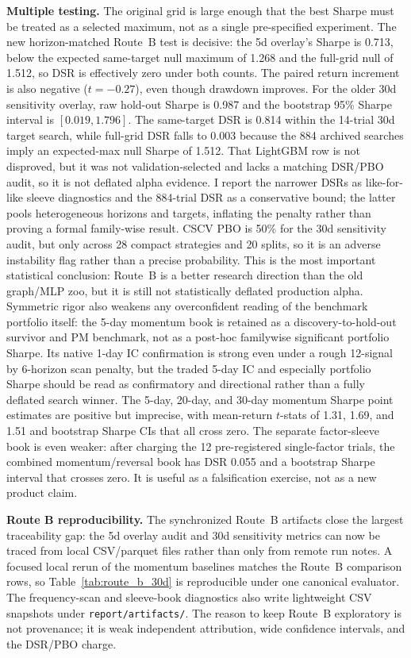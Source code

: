 \documentclass[9pt]{extarticle}
\begin{document}
\textbf{Multiple testing.} The original grid is large enough that the best
Sharpe must be treated as a selected maximum, not as a single pre-specified
experiment. The new horizon-matched Route~B test is decisive: the 5d overlay's
Sharpe is 0.713, below the expected same-target null maximum of 1.268 and the
full-grid null of 1.512, so DSR is effectively zero under both counts. The paired
return increment is also negative ($t=-0.27$), even though drawdown improves. For
the older 30d sensitivity overlay, raw hold-out Sharpe is 0.987 and the bootstrap
95\% Sharpe interval is $[0.019,1.796]$. The same-target DSR is 0.814 within the
14-trial 30d target search, while full-grid DSR falls to 0.003 because the 884
archived searches imply an expected-max null Sharpe of 1.512. That LightGBM row
is not disproved, but it was not validation-selected and lacks a matching
DSR/PBO audit, so it is not deflated alpha evidence. I report the narrower DSRs
as like-for-like sleeve diagnostics and the 884-trial DSR as a conservative
bound; the latter pools heterogeneous horizons and targets, inflating the penalty
rather than proving a formal family-wise result. CSCV PBO is 50\% for the 30d
sensitivity audit, but only across 28 compact strategies and 20 splits, so it is
an adverse instability flag rather than a precise probability. This is the most
important statistical conclusion: Route~B is a better research direction than
the old graph/MLP zoo, but it is still not statistically deflated production
alpha. Symmetric rigor
also weakens any overconfident reading of the benchmark portfolio itself: the
5-day momentum book is retained as a discovery-to-hold-out survivor and PM
benchmark, not as a post-hoc familywise significant portfolio Sharpe. Its
native 1-day IC confirmation is strong even under a rough 12-signal by 6-horizon
scan penalty, but the traded 5-day IC and especially portfolio Sharpe should be
read as confirmatory and directional rather than a fully deflated search
winner. The 5-day, 20-day, and 30-day momentum Sharpe point estimates are
positive but imprecise, with mean-return $t$-stats of 1.31, 1.69, and 1.51 and
bootstrap Sharpe CIs that all cross zero. The separate factor-sleeve book is even weaker:
after charging
the 12 pre-registered single-factor trials, the combined momentum/reversal book
has DSR 0.055 and a bootstrap Sharpe interval that crosses zero. It is useful as
a falsification exercise, not as a new product claim.

\textbf{Route B reproducibility.} The synchronized Route~B artifacts close the
largest traceability gap: the 5d overlay audit and 30d sensitivity metrics can
now be traced from local CSV/parquet files rather than only from remote run
notes. A focused local rerun of the momentum baselines matches the Route~B
comparison rows, so Table~\ref{tab:route_b_30d} is reproducible under one
canonical evaluator. The frequency-scan and sleeve-book diagnostics also write
lightweight CSV snapshots under \texttt{report/artifacts/}. The reason to keep
Route~B exploratory is not provenance; it is weak independent attribution, wide
confidence intervals, and the DSR/PBO charge.
\end{document}
